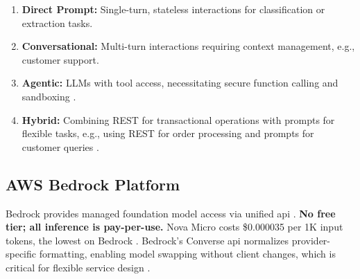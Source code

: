 \begin{enumerate}
    \item \textbf{Direct Prompt:} Single-turn, stateless interactions for classification or extraction tasks.
    \item \textbf{Conversational:} Multi-turn interactions requiring context management, e.g., customer support.
    \item \textbf{Agentic:} LLMs with tool access, necessitating secure function calling and sandboxing \cite{aws_bedrock_2025, schluntz_building_2024}.
    \item \textbf{Hybrid:} Combining REST for transactional operations with prompts for flexible tasks, e.g., using REST for order processing and prompts for customer queries \cite{lercher_managing_2024, chen_prompt_2025}.
\end{enumerate}

\subsection{AWS Bedrock Platform}

Bedrock provides managed foundation model access via unified \gls{api} \cite{aws_bedrock_2025}. \textbf{No free tier; all inference is pay-per-use.} Nova Micro costs \$0.000035 per 1K input tokens, the lowest on Bedrock \cite{aws_nova_2025}. Bedrock's Converse \gls{api} normalizes provider-specific formatting, enabling model swapping without client changes, which is critical for flexible service design \cite{aws_bedrock_2025}.
